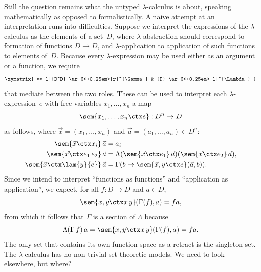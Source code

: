 Still the question remains what the untyped $\lambda$-calculus is
about, speaking mathematically as opposed to formalistically. A naive
attempt at an interpretation runs into difficulties.
%
Suppose we interpret the expressions of the $\lambda$-calculus as the elements of a set~$D$, where $\lambda$-abstraction should correspond to formation of functions $D \to D$, and $\lambda$-application to application of such functions to elements of~$D$.
%
Because every $\lambda$-expression may be used either as an argument or a function, we require
%
\begin{equation}
  \label{eq:lambda-section-retraction}
  \xymatrix{
    **[l]{D^D}
    \ar@<+0.25em>[r]^{\Gamma}
    &
    {D}
    \ar@<+0.25em>[l]^{\Lambda}
  }
\end{equation}
%
that mediate between the two roles. These can be used to interpret
each $\lambda$-expression~$e$ with free variables $x_1, \ldots, x_n$ a map
%
\begin{equation*}
  \sem{x_1, \ldots, x_n \ctx e} : D^n \to D
\end{equation*}
%
as follows, where $\vec{x} = (x_1, \ldots, x_n)$ and $\vec{a} = (a_1, \ldots, a_n) \in D^n$:
%
\begin{equation}
  \label{eq:semantics-lambda-calculus}
  \begin{aligned}
    \sem{\vec{x} \ctx x_i} \, \vec{a} &= a_i \\
    \sem{\vec{x} \ctx e_1\, e_2} \, \vec{a} &= 
    \Lambda(\sem{\vec{x} \ctx e_1} \, \vec{a}) (\sem{\vec{x} \ctx e_2} \, \vec{a}), \\
    \sem{\vec{x} \ctx \lam{y}{e}} \, \vec{a} &= \Gamma(b \mapsto \sem{\vec{x}, y \ctx e} (\vec{a}, b)).
  \end{aligned}
\end{equation}
%
Since we intend to interpret ``functions as functions'' and ``application as application'', we expect, for all $f : D \to D$ and $a \in D$,
%
\begin{equation*}
  \sem{x, y \ctx x \, y}(\Gamma(f), a) = f a,
\end{equation*}
%
from which it follows that $\Gamma$ is a section of $\Lambda$ because
%
\begin{equation*}
  \Lambda (\Gamma \, f) \, a =
  \sem{x, y \ctx x \, y}(\Gamma(f), a) = f a.
\end{equation*}
%
The only set that contains its own function space as a retract is the singleton set. The $\lambda$-calculus has no non-trivial set-theoretic models. We need to look elsewhere, but where?

